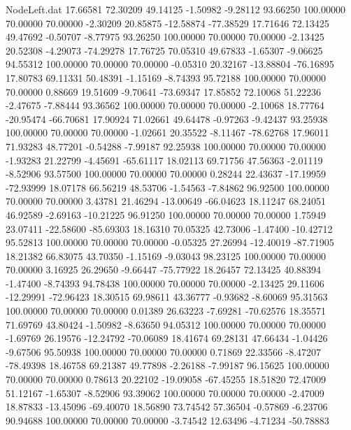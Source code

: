 \begin{filecontents}{NodeLeft.dat}
  17.66581   72.30209   49.14125    -1.50982   -9.28112   93.66250  100.00000   70.00000   70.00000   -2.30209   20.85875  -12.58874  -77.38529
  17.71646   72.13425   49.47692    -0.50707   -8.77975   93.26250  100.00000   70.00000   70.00000   -2.13425   20.52308   -4.29073  -74.29278
  17.76725   70.05310   49.67833    -1.65307   -9.06625   94.55312  100.00000   70.00000   70.00000   -0.05310   20.32167  -13.88804  -76.16895
  17.80783   69.11331   50.48391    -1.15169   -8.74393   95.72188  100.00000   70.00000   70.00000    0.88669   19.51609   -9.70641  -73.69347
  17.85852   72.10068   51.22236    -2.47675   -7.88444   93.36562  100.00000   70.00000   70.00000   -2.10068   18.77764  -20.95474  -66.70681
  17.90924   71.02661   49.64478    -0.97263   -9.42437   93.25938  100.00000   70.00000   70.00000   -1.02661   20.35522   -8.11467  -78.62768
  17.96011   71.93283   48.77201    -0.54288   -7.99187   92.25938  100.00000   70.00000   70.00000   -1.93283   21.22799   -4.45691  -65.61117
  18.02113   69.71756   47.56363    -2.01119   -8.52906   93.57500  100.00000   70.00000   70.00000    0.28244   22.43637  -17.19959  -72.93999
  18.07178   66.56219   48.53706    -1.54563   -7.84862   96.92500  100.00000   70.00000   70.00000    3.43781   21.46294  -13.00649  -66.04623
  18.11247   68.24051   46.92589    -2.69163  -10.21225   96.91250  100.00000   70.00000   70.00000    1.75949   23.07411  -22.58600  -85.69303
  18.16310   70.05325   42.73006    -1.47400  -10.42712   95.52813  100.00000   70.00000   70.00000   -0.05325   27.26994  -12.40019  -87.71905
  18.21382   66.83075   43.70350    -1.15169   -9.03043   98.23125  100.00000   70.00000   70.00000    3.16925   26.29650   -9.66447  -75.77922
  18.26457   72.13425   40.88394    -1.47400   -8.74393   94.78438  100.00000   70.00000   70.00000   -2.13425   29.11606  -12.29991  -72.96423
  18.30515   69.98611   43.36777    -0.93682   -8.60069   95.31563  100.00000   70.00000   70.00000    0.01389   26.63223   -7.69281  -70.62576
  18.35571   71.69769   43.80424    -1.50982   -8.63650   94.05312  100.00000   70.00000   70.00000   -1.69769   26.19576  -12.24792  -70.06089
  18.41674   69.28131   47.66434    -1.04426   -9.67506   95.50938  100.00000   70.00000   70.00000    0.71869   22.33566   -8.47207  -78.49398
  18.46758   69.21387   49.77898    -2.26188   -7.99187   96.15625  100.00000   70.00000   70.00000    0.78613   20.22102  -19.09058  -67.45255
  18.51820   72.47009   51.12167    -1.65307   -8.52906   93.39062  100.00000   70.00000   70.00000   -2.47009   18.87833  -13.45096  -69.40070
  18.56890   73.74542   57.36504    -0.57869   -6.23706   90.94688  100.00000   70.00000   70.00000   -3.74542   12.63496   -4.71234  -50.78883

\end{filecontents}
